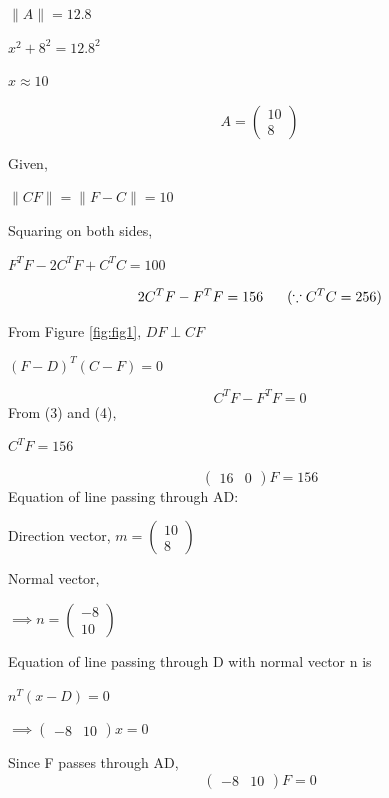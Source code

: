 \documentclass[letterpaper,12pt]{article}
\begin{document}
\clearpage

\begin{center}
    $\|A\| = 12.8$
\end{center}
\begin{center}
    $x^2 + 8^2 = 12.8^2$
\end{center}
\begin{center}
    $x \approx 10$
\end{center}
\begin{equation}
    A = \begin{pmatrix} 10 \\ 8 \end{pmatrix}
\end{equation}

Given,
\begin{center}
    $\|CF\| = \|F - C\| = 10$
\end{center}
Squaring on both sides,
\begin{center}
    $F^TF - 2C^TF + C^TC = 100$
\end{center}
\begin{equation}
    2C^TF - F^TF = 156 \hspace{0.6cm} (\because C^TC = 256)
\end{equation}

From Figure \ref{fig:fig1}, $DF \perp CF$
\begin{center}
    $(F-D)^T(C-F) = 0$
\end{center}
\begin{equation}
    C^TF - F^TF = 0
\end{equation}
From (3) and (4),
\begin{center}
    $C^TF = 156$
\end{center}
\begin{equation}
    \begin{pmatrix} 16 & 0 \end{pmatrix}F = 156
\end{equation}
Equation of line passing through AD:
\begin{center}
    Direction vector, $m = \begin{pmatrix} 10 \\ 8 \end{pmatrix}$
\end{center}
Normal vector,
\begin{center}
    $\implies n = \begin{pmatrix} -8 \\ 10 \end{pmatrix}$
\end{center}
Equation of line passing through D with normal vector n is
\begin{center}
    $n^T(x - D) = 0$
\end{center}
\begin{center}
    $\implies \begin{pmatrix} -8 & 10 \end{pmatrix}x = 0$
\end{center}
Since F passes through AD,
\begin{equation}
    \begin{pmatrix} -8 & 10 \end{pmatrix}F = 0
\end{equation}
\end{document}
